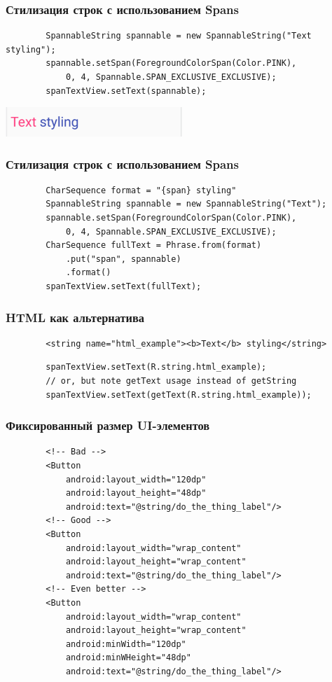 \documentclass{beamer}
\begin{document}
\begin{frame}[fragile]
    \frametitle{Стилизация строк с использованием Spans}
    \begin{verbatim}
        SpannableString spannable = new SpannableString("Text styling");
        spannable.setSpan(ForegroundColorSpan(Color.PINK),
            0, 4, Spannable.SPAN_EXCLUSIVE_EXCLUSIVE);
        spanTextView.setText(spannable);
    \end{verbatim}
    \begin{center}
        \includegraphics[width=0.5\textwidth,keepaspectratio]{images/span}
    \end{center}
\end{frame}

\begin{frame}[fragile]
    \frametitle{Стилизация строк с использованием Spans}
    \begin{verbatim}
        CharSequence format = "{span} styling"
        SpannableString spannable = new SpannableString("Text");
        spannable.setSpan(ForegroundColorSpan(Color.PINK),
            0, 4, Spannable.SPAN_EXCLUSIVE_EXCLUSIVE);
        CharSequence fullText = Phrase.from(format)
            .put("span", spannable)
            .format()
        spanTextView.setText(fullText);
    \end{verbatim}
\end{frame}
\begin{frame}[fragile]
    \frametitle{HTML как альтернатива}
    \begin{verbatim}
        <string name="html_example"><b>Text</b> styling</string>
    \end{verbatim}
    \begin{verbatim}
        spanTextView.setText(R.string.html_example);
        // or, but note getText usage instead of getString
        spanTextView.setText(getText(R.string.html_example));
    \end{verbatim}
\end{frame}

\begin{frame}[fragile]
    \frametitle{Фиксированный размер UI-элементов}
    \begin{verbatim}
        <!-- Bad -->
        <Button
            android:layout_width="120dp"
            android:layout_height="48dp"
            android:text="@string/do_the_thing_label"/>
        <!-- Good -->
        <Button
            android:layout_width="wrap_content"
            android:layout_height="wrap_content"
            android:text="@string/do_the_thing_label"/>
        <!-- Even better -->
        <Button
            android:layout_width="wrap_content"
            android:layout_height="wrap_content"
            android:minWidth="120dp"
            android:minWHeight="48dp"
            android:text="@string/do_the_thing_label"/>
    \end{verbatim}
\end{frame}
\end{document}
